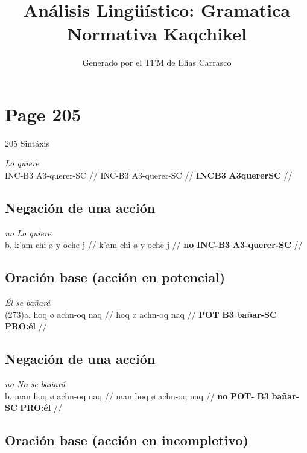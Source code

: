 \documentclass{article}%
\title{Análisis Lingüístico: Gramatica Normativa Kaqchikel}%
\author{Generado por el TFM de Elías Carrasco}%
\begin{document}
%
\normalsize%
\maketitle%
\section{Page 205}%
\label{sec:Page205}%
205 Sintáxis %
\par\medskip%
\ex
\textit{Lo quiere} \\
\begingl
\gla INC-B3 A3-querer-SC //
\glb INC-B3 A3-querer-SC //
\glc \textbf{INC}\textbf{B3} \textbf{A3}\textbf{querer}\textbf{SC} //
\endgl
\xe
%
\medskip%
\subsection{Negación de una acción}%
\label{subsec:Negacindeunaaccin}%

%
\par\medskip%
\ex
\textit{no Lo quiere} \\
\begingl
\gla b. k’am chi-ø y-oche-j //
\glb k’am chi-ø y-oche-j //
\glc \textbf{no} \textbf{INC-}\textbf{B3} \textbf{A3-}\textbf{querer-}\textbf{SC} //
\endgl
\xe
%
\medskip%
\subsection{Oración base (acción en potencial)}%
\label{subsec:Oracinbase(accinenpotencial)}%

%
\par\medskip%
\ex
\textit{Él se bañará} \\
\begingl
\gla (273)a. hoq ø achn-oq naq //
\glb hoq ø achn-oq naq //
\glc \textbf{POT} \textbf{B3} \textbf{bañar-}\textbf{SC} \textbf{PRO:él} //
\endgl
\xe
%
\medskip%
\subsection{Negación de una acción}%
\label{subsec:Negacindeunaaccin}%

%
\par\medskip%
\ex
\textit{no No se bañará} \\
\begingl
\gla b. man hoq ø achn-oq naq //
\glb man hoq ø achn-oq naq //
\glc \textbf{no} \textbf{POT-} \textbf{B3} \textbf{bañar-}\textbf{SC} \textbf{PRO:él} //
\endgl
\xe
%
\medskip%
\subsection{Oración base (acción en incompletivo)}%
\label{subsec:Oracinbase(accinenincompletivo)}%
\end{document}

